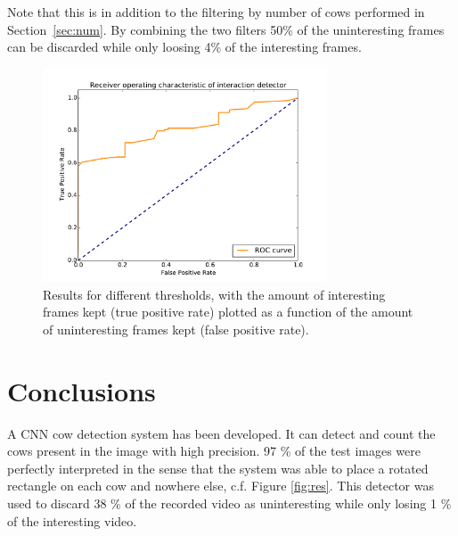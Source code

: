 \documentclass{IET}
\begin{document}
Note that this is in addition to the filtering by number of cows performed in Section~\ref{sec:num}. By combining the two filters 50\% of the uninteresting frames can be discarded while only loosing 4\% of the interesting frames.

\begin{figure}[tb]
\begin{center}
  \includegraphics[width=0.75\textwidth]{roc.pdf}
\end{center}
  \caption{Results for different thresholds, with the amount of interesting frames kept (true positive rate) plotted as a function of the amount of uninteresting frames kept (false positive rate).}
  \label{fig:roc}
\end{figure}


\section{Conclusions}
A CNN cow detection system has been developed. It can detect and count the cows present in the image with high precision. 97 \% of the test images were perfectly interpreted in the sense that the system was able to place a rotated rectangle on each cow and nowhere else, c.f. Figure \ref{fig:res}. This detector was used to discard 38 \% of the recorded video as uninteresting while only losing 1 \% of the interesting video.


{\parindent0pt
\parskip8pt

}
\end{document}
